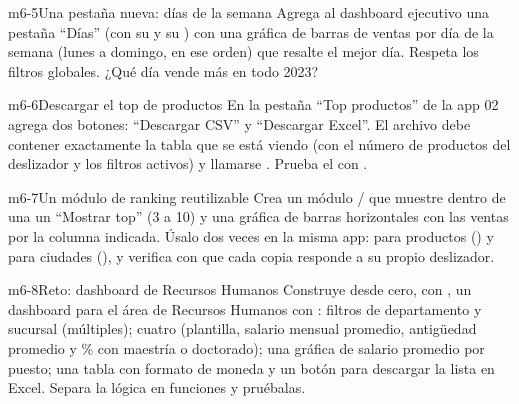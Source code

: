 \begin{ejercicio}{m6-5}{Una pestaña nueva: días de la semana}
Agrega al dashboard ejecutivo una pestaña ``Días'' (con su
 y su ) con una gráfica de barras de
ventas por día de la semana (lunes a domingo, en ese orden) que resalte el
mejor día. Respeta los filtros globales. ¿Qué día vende más en todo 2023?
\end{ejercicio}

\begin{ejercicio}{m6-6}{Descargar el top de productos}
En la pestaña ``Top productos'' de la app 02 agrega dos botones: ``Descargar
CSV'' y ``Descargar Excel''. El archivo debe contener exactamente la tabla
que se está viendo (con el número de productos del deslizador y los filtros
activos) y llamarse . Prueba el
 con .
\end{ejercicio}

\begin{ejercicio}{m6-7}{Un módulo de ranking reutilizable}
Crea un módulo  /
 que muestre dentro de una
 un  ``Mostrar top'' (3 a 10) y una
gráfica de barras horizontales con las ventas por la columna indicada.
Úsalo dos veces en la misma app: para productos
() y para ciudades (), y verifica
con  que cada copia responde a su propio deslizador.
\end{ejercicio}

\begin{ejercicio}{m6-8}{Reto: dashboard de Recursos Humanos}
Construye desde cero, con , un dashboard para el
área de Recursos Humanos con : filtros de
departamento y sucursal (múltiples); cuatro  (plantilla,
salario mensual promedio, antigüedad promedio y \% con maestría o
doctorado); una gráfica de salario promedio por puesto; una tabla
 con formato de moneda y un botón para descargar la lista en
Excel. Separa la lógica en funciones y pruébalas.
\end{ejercicio}
